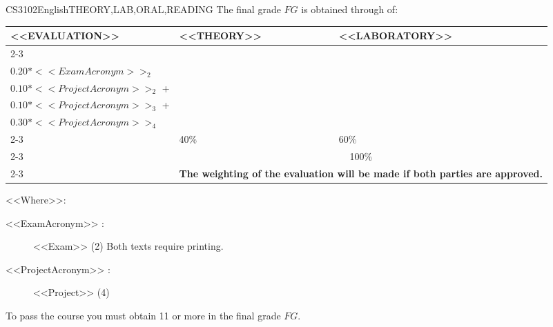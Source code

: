  \begin{evaluation}{CS3102}{English}{THEORY,LAB,ORAL,READING}
  The final grade $FG$ is obtained through of:

  \begin{tabularx}{0.9\textwidth}{|X|p{}|p{}|} \hline
  \multirow{4}{*}{\uppercase{<<Evaluation>>}} & \uppercase{<<Theory>>} & \uppercase{<<Laboratory>>} \\ \cline{2-3}
  & %
      \begin{minipage}{0.95\textwidth}
      \begin{tabular}{l}
        $0.20*<<ExamAcronym>>_{1}$  + \\
        $0.20*<<ExamAcronym>>_{2}$ 
      \end{tabular} 
      \end{minipage} 
  & %
      \begin{minipage}{0.95\textwidth}
      \begin{tabular}{l}
        $0.10*<<ProjectAcronym>>_{1}$  + \\
        $0.10*<<ProjectAcronym>>_{2}$  + \\
        $0.10*<<ProjectAcronym>>_{3}$  + \\
        $0.30*<<ProjectAcronym>>_{4}$
      \end{tabular} 
      \end{minipage}                 \\ \cline{2-3}
  
  & %
  40\% 
  & %
  60\% \\ \cline{2-3}
  & \multicolumn{2}{c|}{100\%}  \\ \cline{2-3}
  & \multicolumn{2}{c|}{\textbf{The weighting of the evaluation will be made if both parties are approved.}}  \\ \hline
  \end{tabularx}
    
  \vspace{2mm}
  \noindent <<Where>>:
  \begin{description}
      \item[<<ExamAcronym>> :] <<Exam>> (2) Both texts require printing.
      \item[<<ProjectAcronym>> :] <<Project>> (4)
  \end{description}
  
  \noindent To pass the course you must obtain 11 or more in the final grade $FG$.
  \end{evaluation}

